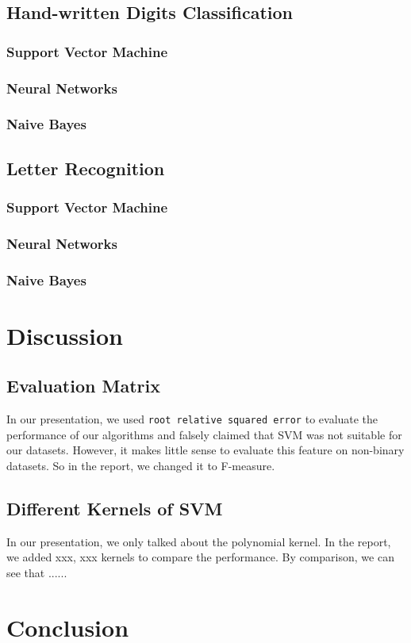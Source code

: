 \documentclass[11pt]{article}
\begin{document}
\subsection{Hand-written Digits Classification}
\subsubsection{Support Vector Machine}

\subsubsection{Neural Networks}

\subsubsection{Naive Bayes}

\subsection{Letter Recognition}
\subsubsection{Support Vector Machine}

\subsubsection{Neural Networks}

\subsubsection{Naive Bayes}

\section{Discussion}
\subsection{Evaluation Matrix}
In our presentation, we used \texttt{root relative squared error} to evaluate the performance of our algorithms and falsely claimed that SVM was not suitable for our datasets. However, it makes little sense to evaluate this feature on  non-binary datasets. So in the report, we changed it to F-measure.

\subsection{Different Kernels of SVM}
In our presentation, we only talked about the polynomial kernel. In the report, we added xxx, xxx kernels to compare the performance. By comparison, we can see that ......
 
\section{Conclusion}



\newpage


\end{document}
